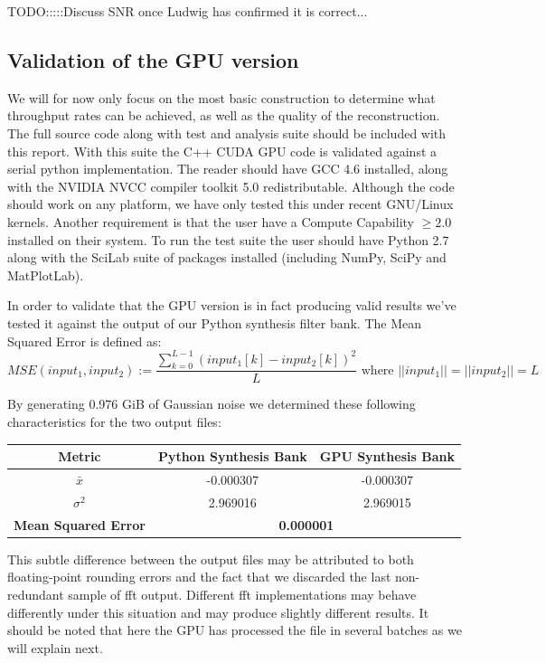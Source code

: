\documentclass[a4paper,10pt]{article}
\begin{document}
{\color{red} TODO:::::Discuss SNR once Ludwig has confirmed it is correct...}

\subsection{Validation of the GPU version}
We will for now only focus on the most basic construction to determine what throughput rates can be achieved, as well as the quality of the reconstruction. The full source code
along with test and analysis suite should be included with this report. With this suite the C++ CUDA GPU code is validated against a serial python implementation. The reader 
should have GCC 4.6 installed, along with the NVIDIA NVCC compiler toolkit 5.0 redistributable. Although the code should work on any platform, we have only tested this under 
recent GNU/Linux kernels. Another requirement is that the user have a Compute Capability $\geq2.0$ installed on their system. To run the test suite the user should have 
Python 2.7 along with the SciLab suite of packages installed (including NumPy, SciPy and MatPlotLab).

In order to validate that the GPU version is in fact producing valid results we've tested it against the output of our Python synthesis filter bank. The Mean Squared Error 
is defined as:
\begin{equation}
 MSE(input_1,input_2) := \frac{\sum_{k=0}^{L-1}{(input_1[k] - input_2[k])^2}}{L} \text{ where } ||input_1|| = ||input_2|| = L
\end{equation}

By generating 0.976 GiB of Gaussian noise we determined these following characteristics for the two output files:
\begin{center}
  \begin{tabular}{|c|c|c|}
    \hline
    \textbf{Metric} & \textbf{Python Synthesis Bank} & \textbf{GPU Synthesis Bank} \\
    \hline
    $\bar x$ & -0.000307 & -0.000307 \\
    \hline
    $\sigma^{2}$ & 2.969016 & 2.969015 \\
    \hline
    \textbf{Mean Squared Error} & \multicolumn{2}{|c|}{\textbf{0.000001}} \\
    \hline
  \end{tabular}
\end{center}

This subtle difference between the output files may be attributed to both floating-point rounding errors and the fact that we discarded the last non-redundant
sample of \gls{fft} output. Different \gls{fft} implementations may behave differently under this situation and may produce slightly different results. It should be noted
that here the GPU has processed the file in several batches as we will explain next.
\end{document}
